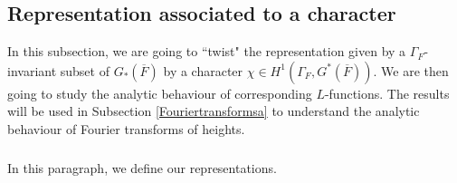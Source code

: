 \documentclass[a4paper,english,12pt]{amsart}
\newcommand{\oF}{\overline F}
\numberwithin{equation}{subsection}
\begin{document}
\subsection{Representation associated to a character} In this subsection, we are going to ``twist" the representation given by a $\Gamma_F$-invariant subset of $G_*(\oF)$ by a character $\chi\in H^1(\Gamma_F, G^*(\oF))$. We are then going to study the analytic behaviour of corresponding $L$-functions. The results will be used in Subsection \ref{Fouriertransformsa} to understand the analytic behaviour of Fourier transforms of heights. 

\subsubsection{}\label{definofreprho} In this paragraph, we define our representations.
\end{document}
